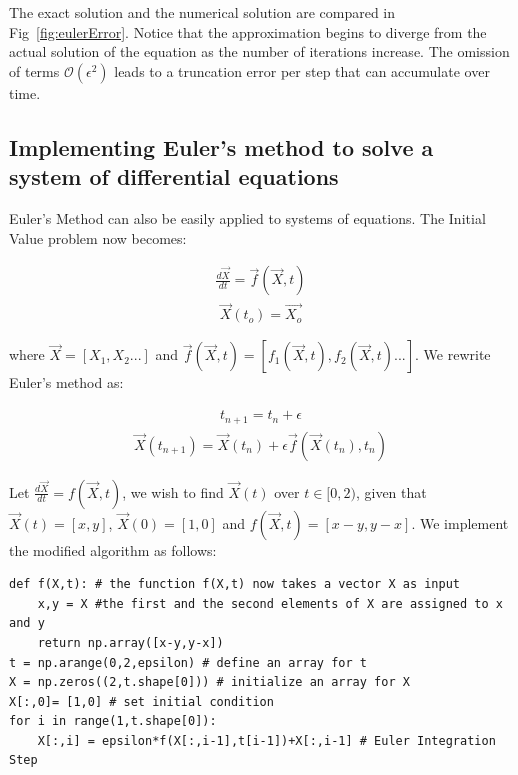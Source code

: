 \documentclass[10pt,letterpaper]{article}
\begin{document}
The exact solution and the numerical solution are compared in Fig~\ref{fig:eulerError}. Notice that the approximation begins to diverge from the actual solution of the equation as the number of iterations increase. The omission of terms $\mathcal{O}(\epsilon^2)$ leads to a truncation error per step that can accumulate over time. 

\subsection*{Implementing Euler's method to solve a system of differential equations}

Euler's Method can also be easily applied to systems of equations. The Initial Value problem now becomes:

\begin{eqnarray}\frac{d\vec{X}}{dt} = \vec{f}(\vec{X}, t)\end{eqnarray}
\begin{eqnarray}\vec{X}(t_o) = \vec{X_o}\end{eqnarray}

where $\vec{X}=[X_1,X_2...]$ and $\vec{f}(\vec{X}, t)=[f_1(\vec{X}, t),f_2(\vec{X}, t)...]$. We rewrite Euler's method as:

\begin{eqnarray}t_{n+1} = t_n + \epsilon \end{eqnarray}
\begin{eqnarray}\vec{X}(t_{n+1}) = \vec{X}(t_{n}) + \epsilon \vec{f}(\vec{X}(t_{n}), t_n)\end{eqnarray}

Let $\frac{d\vec{X}}{dt}=f(\vec{X},t)$, we wish to find $\vec{X}(t)$ over $t\in[0,2)$, given that $\vec{X}(t)=[x,y]$, $\vec{X}(0)=[1,0]$ and $f(\vec{X},t) = [x-y,y-x]$. We implement the modified algorithm as follows:

\begin{verbatim}
def f(X,t): # the function f(X,t) now takes a vector X as input
    x,y = X #the first and the second elements of X are assigned to x and y
    return np.array([x-y,y-x])
t = np.arange(0,2,epsilon) # define an array for t
X = np.zeros((2,t.shape[0])) # initialize an array for X
X[:,0]= [1,0] # set initial condition
for i in range(1,t.shape[0]):
    X[:,i] = epsilon*f(X[:,i-1],t[i-1])+X[:,i-1] # Euler Integration Step
\end{verbatim}
\end{document}
